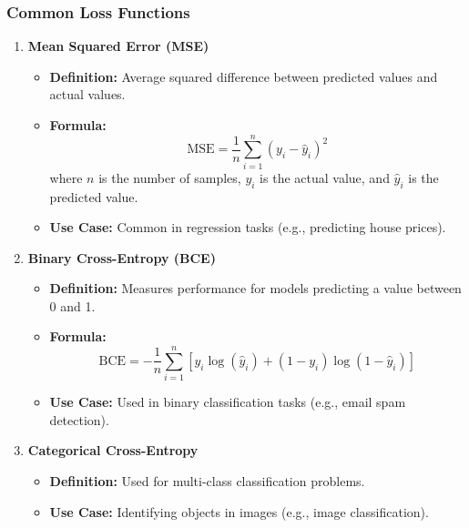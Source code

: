 \documentclass[aspectratio=169]{beamer}
\begin{document}
\begin{frame}[fragile]
    \frametitle{Common Loss Functions}
    \begin{enumerate}
        \item \textbf{Mean Squared Error (MSE)}
            \begin{itemize}
                \item \textbf{Definition:} Average squared difference between predicted values and actual values.
                \item \textbf{Formula:} 
                \begin{equation}
                    \text{MSE} = \frac{1}{n} \sum_{i=1}^{n} (y_i - \hat{y}_i)^2
                \end{equation}
                where \( n \) is the number of samples, \( y_i \) is the actual value, and \( \hat{y}_i \) is the predicted value.
                \item \textbf{Use Case:} Common in regression tasks (e.g., predicting house prices).
            \end{itemize}
        
        \item \textbf{Binary Cross-Entropy (BCE)}
            \begin{itemize}
                \item \textbf{Definition:} Measures performance for models predicting a value between 0 and 1.
                \item \textbf{Formula:} 
                \begin{equation}
                    \text{BCE} = -\frac{1}{n} \sum_{i=1}^{n} [y_i \log(\hat{y}_i) + (1 - y_i) \log(1 - \hat{y}_i)]
                \end{equation}
                \item \textbf{Use Case:} Used in binary classification tasks (e.g., email spam detection).
            \end{itemize}

        \item \textbf{Categorical Cross-Entropy}
            \begin{itemize}
                \item \textbf{Definition:} Used for multi-class classification problems.
                \item \textbf{Use Case:} Identifying objects in images (e.g., image classification).
            \end{itemize}
    \end{enumerate}
\end{frame}
\end{document}

